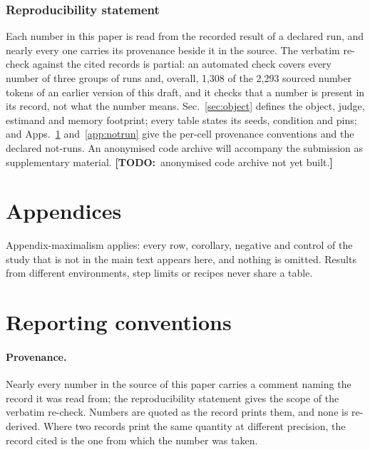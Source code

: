 \documentclass{article} %
\newcommand{\TODO}[1]{{\color{orange}\textbf{[TODO:}~#1\textbf{]}}}
\begin{document}
\subsubsection*{Reproducibility statement}
Each number in this paper is read from the recorded result of a declared run, and nearly every
one carries its provenance beside it in the source. The verbatim re-check against the cited records
is partial: an automated check covers every number of three groups of runs and, overall, 1,308 of %
the 2,293 sourced number tokens of an earlier version of this draft, and it checks that a number is %
present in its record, not what the number means. Sec.~\ref{sec:object} defines the
object, judge, estimand and memory footprint; every table states its seeds, condition and pins; and
Apps.~\ref{app:conventions} and~\ref{app:notrun} give the per-cell provenance conventions and
the declared not-runs. An anonymised code archive will accompany the submission as
supplementary material. \TODO{anonymised code archive not yet built.}


\clearpage
\appendix
\section*{Appendices}
Appendix-maximalism applies: every row, corollary, negative and control of the study that is
not in the main text appears here, and nothing is omitted. Results from different
environments, step limits or recipes never share a table.

\section{Reporting conventions}
\label{app:conventions}

\paragraph{Provenance.} Nearly every number in the source of this paper carries a comment naming
the record it was read from; the reproducibility statement gives the scope of the verbatim re-check. Numbers are quoted as the record prints them, and none is
re-derived. Where two records print the same quantity at different precision, the record
cited is the one from which the number was taken.
\end{document}
